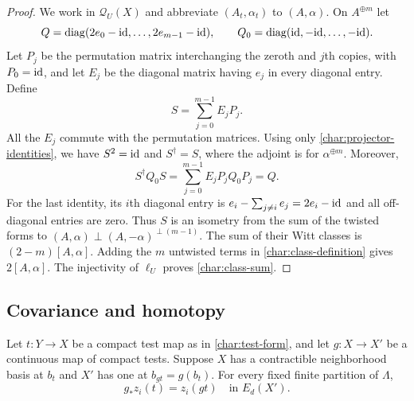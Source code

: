 \begin{proof}
We work in $\mathcal Q_U(X)$ and abbreviate $(A_t,\alpha_t)$ to
$(A,\alpha)$.  On $A^{\oplus m}$ let
\[
 Q=\operatorname{diag}(2e_0-\mathrm{id},\ldots,2e_{m-1}-\mathrm{id}),
 \qquad Q_0=\operatorname{diag}(\mathrm{id},-\mathrm{id},\ldots,-\mathrm{id}).
\]
Let $P_j$ be the permutation matrix interchanging the zeroth and
$j$th copies, with $P_0=\mathrm{id}$, and let $E_j$ be the diagonal matrix
having $e_j$ in every diagonal entry.  Define
\[
 S=\sum_{j=0}^{m-1}E_jP_j.
\]
All the $E_j$ commute with the permutation matrices.  Using only
\eqref{char:projector-identities}, we have $S^2=\mathrm{id}$ and
$S^\dagger=S$, where the adjoint is for $\alpha^{\oplus m}$.
Moreover,
\[
 S^\dagger Q_0 S
  =\sum_{j=0}^{m-1}E_jP_jQ_0P_j
  =Q.
\]
For the last identity, its $i$th diagonal entry is
$e_i-\sum_{j\ne i}e_j=2e_i-\mathrm{id}$ and all off-diagonal entries are zero.
Thus $S$ is an isometry from the sum of the twisted forms to
$(A,\alpha)\perp(A,-\alpha)^{\perp(m-1)}$.  The sum of their Witt
classes is $(2-m)[A,\alpha]$.  Adding the $m$ untwisted terms in
\eqref{char:class-definition} gives $2[A,\alpha]$.  The injectivity
of $\ell_U$ proves \eqref{char:class-sum}.
\end{proof}

\subsection{Covariance and homotopy}

\begin{proposition}\label{prop:class-covariance}
Let $t:Y\to X$ be a compact test map as in \eqref{char:test-form},
and let $g:X\to X'$ be a continuous map of compact tests. Suppose $X$
has a contractible neighborhood basis at $b_t$ and $X'$ has one at
$b_{gt}=g(b_t)$.  For every fixed finite partition of $\Lambda$,
\begin{equation}\label{char:covariance}
 g_*z_i(t)=z_i(gt)\quad\text{in }E_d(X').
\end{equation}
\end{proposition}

